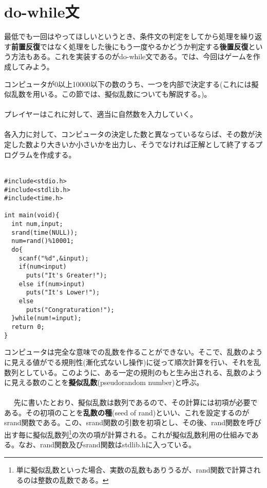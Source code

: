 \section{do-while文}
最低でも一回はやってほしいというとき、条件文の判定をしてから処理を繰り返す\textbf{前置反復}ではなく処理をした後にもう一度やるかどうか判定する\textbf{後置反復}という方法もある。これを実装するのがdo-while文である。では、今回はゲームを作成してみよう。
\begin{boxnote}
\begin{multicols}{2}
コンピュータが0以上10000以下の数のうち、一つを内部で決定する(これには擬似乱数を用いる。この節では、擬似乱数についても解説する。)。
\\ \\
プレイヤーはこれに対して、適当に自然数を入力していく。
\\ \\
各入力に対して、コンピュータの決定した数と異なっているならば、その数が決定した数より大きいか小さいかを出力し、そうでなければ正解として終了するプログラムを作成する。\\　
\begin{lstlisting}[caption=数当てゲーム,label=program5_3]
#include<stdio.h>
#include<stdlib.h>
#include<time.h>

int main(void){
  int num,input;
  srand(time(NULL));
  num=rand()%10001;
  do{
    scanf("%d",&input);
    if(num<input)
      puts("It's Greater!");
    else if(num>input)
      puts("It's Lower!");
    else
      puts("Congraturation!");
  }while(num!=input);
  return 0;
}
\end{lstlisting}
\end{multicols}
\end{boxnote}
コンピュータは完全な意味での乱数を作ることができない。そこで、乱数のように見える値がでる規則性(漸化式ないし操作)に従って順次計算を行い、それを乱数列としている。このように、ある一定の規則のもと生み出される、乱数のように見える数のことを\textbf{擬似乱数}(pseudorandom number)と呼ぶ。
\\ \\　
先に書いたとおり、擬似乱数は数列であるので、その計算には初項が必要である。その初項のことを\textbf{乱数の種}(seed of rand)といい、これを設定するのがsrand関数である。この、srand関数の引数を初項とし、その後、rand関数を呼び出す毎に擬似乱数列\footnote{単に擬似乱数といった場合、実数の乱数もありうるが、rand関数で計算されるのは整数の乱数である。}の次の項が計算される。これが擬似乱数利用の仕組みである。なお、rand関数及びsrand関数はstdlib.hに入っている。
